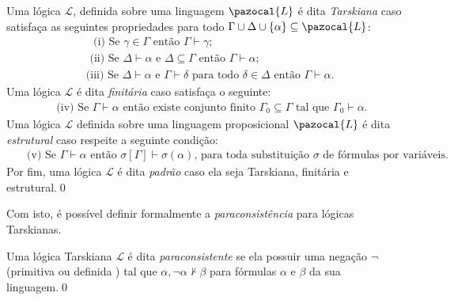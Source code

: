 \begin{definicao}
    \label{def:padrao}
    Uma lógica $\mathcal{L}$, definida sobre uma linguagem $\pazocal{L}$ é dita \textit{Tarskiana} caso satisfaça as seguintes propriedades para todo $\Gamma \cup \Delta \cup \{\alpha\} \subseteq \pazocal{L}$:
    \begin{align*}
         & \text{~~(i) Se } \gamma \in \Gamma \text{ então } \Gamma \vdash \gamma;                                                                       \\
         & \text{~(ii) Se } \Delta \vdash \alpha \text{ e } \Delta \subseteq \Gamma \text{ então } \Gamma \vdash \alpha;                                 \\
         & \text{(iii) Se } \Delta \vdash \alpha \text{ e } \Gamma \vdash \delta \text{ para todo } \delta \in \Delta \text{ então } \Gamma \vdash \alpha.
    \end{align*}
    Uma lógica $\mathcal{L}$ é dita \textit{finitária} caso satisfaça o seguinte:
    \begin{align*}
         & \text{~(iv) Se } \Gamma \vdash \alpha \text{ então existe conjunto finito } \Gamma_{0} \subseteq \Gamma \text{ tal que } \Gamma_{0} \vdash \alpha.
    \end{align*}
    Uma lógica $\mathcal{L}$ definida sobre uma linguagem proposicional $\pazocal{L}$ é dita \textit{estrutural} caso respeite a seguinte condição: 
    \begin{align*}
         & \text{~~(v) Se } \Gamma \vdash \alpha \text{ então } \sigma [\Gamma] \vdash \sigma(\alpha) \text{, para toda substituição } \sigma \text{ de fórmulas por variáveis.}
    \end{align*}
    Por fim, uma lógica $\mathcal{L}$ é dita \textit{padrão} caso ela seja Tarskiana, finitária e estrutural.\qed
\end{definicao}
Com isto, é possível definir formalmente a \textit{paraconsistência} para lógicas Tarskianas.

\begin{definicao}
    \label{def:tarskiana_paracons}
    Uma lógica Tarskiana $\mathcal{L}$ é dita \textit{paraconsistente} se ela possuir uma negação $\neg$ (primitiva ou definida ) tal que $\alpha, \neg \alpha \nvdash \beta$ para  fórmulas $\alpha$ e $\beta$ da sua linguagem.\qed{}
\end{definicao}

